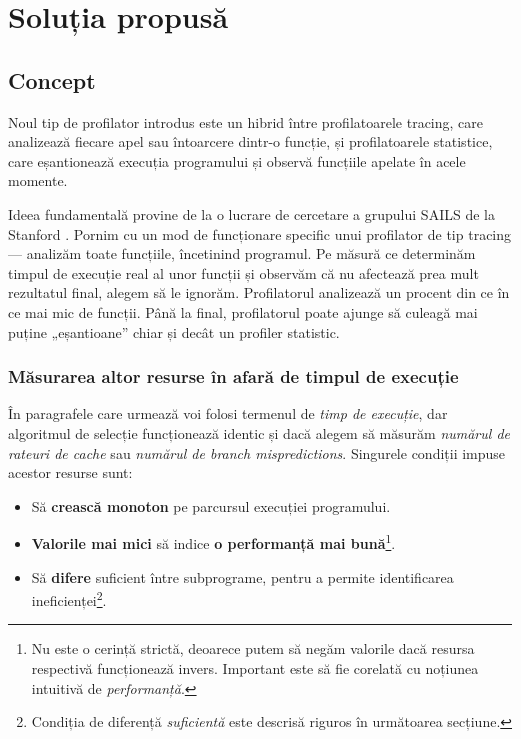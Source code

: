 \chapter{Soluția propusă}

\section{Concept}

Noul tip de profilator introdus este un hibrid între profilatoarele tracing, care analizează fiecare apel sau întoarcere dintr-o funcție, și profilatoarele statistice, care eșantionează execuția programului și observă funcțiile apelate în acele momente.

Ideea fundamentală provine de la o lucrare de cercetare a grupului SAILS de la Stanford \cite{ml_for_systems_profiling}. Pornim cu un mod de funcționare specific unui profilator de tip tracing --- analizăm toate funcțiile, încetinind programul. Pe măsură ce determinăm timpul de execuție real al unor funcții și observăm că nu afectează prea mult rezultatul final, alegem să le ignorăm. Profilatorul analizează un procent din ce în ce mai mic de funcții. Până la final, profilatorul poate ajunge să culeagă mai puține „eșantioane” chiar și decât un profiler statistic.

\subsection*{Măsurarea altor resurse în afară de timpul de execuție}

În paragrafele care urmează voi folosi termenul de \emph{timp de execuție}, dar algoritmul de selecție funcționează identic și dacă alegem să măsurăm \emph{numărul de rateuri de cache} sau \emph{numărul de branch mispredictions}. Singurele condiții impuse acestor resurse sunt:

\label{sec:resource_conditions}

\begin{itemize}
    \item Să \textbf{crească monoton} pe parcursul execuției programului.
    \item \textbf{Valorile mai mici} să indice \textbf{o performanță mai bună}\footnote{Nu este o cerință strictă, deoarece putem să negăm valorile dacă resursa respectivă funcționează invers. Important este să fie corelată cu noțiunea intuitivă de \emph{performanță}.}.
    \item Să \textbf{difere} suficient între subprograme, pentru a permite identificarea ineficienței\footnote{Condiția de diferență \emph{suficientă} este descrisă riguros în următoarea secțiune.}.
\end{itemize}

